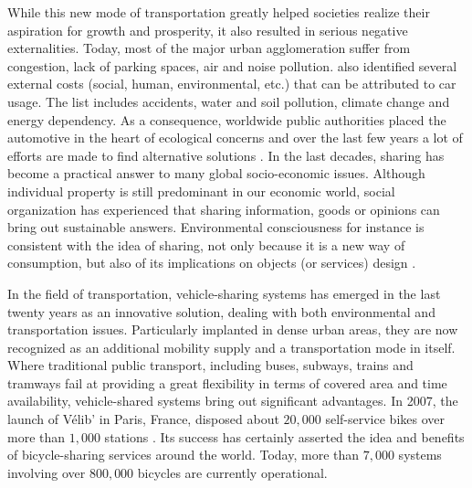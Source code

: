 \begin{bibunit}[ieeetr]
\medskip
While this new mode of transportation greatly helped societies realize their aspiration for growth and prosperity, it also resulted in serious negative externalities.
Today, most of the major urban agglomeration suffer from congestion, lack of parking spaces, air and noise pollution.
\cite{maibach_handbook_2007} also identified several external costs (social, human, environmental, etc.) that can be attributed to car usage.
The list includes accidents, water and soil pollution, climate change and energy dependency.
As a consequence, worldwide public authorities placed the automotive in the heart of ecological concerns and over the last few years a lot of efforts are made to find alternative solutions \cite{mitchell_reinventing_2010}.
In the last decades, sharing has become a practical answer to many global socio-economic issues.
Although individual property is still predominant in our economic world, social organization has experienced that sharing information, goods or opinions can bring out sustainable answers.
Environmental consciousness for instance is consistent with the idea of sharing, not only because it is a new way of consumption, but also of its implications on objects (or services) design \cite{ciari_sharing_2012}.

\medskip
In the field of transportation, vehicle-sharing systems has emerged in the last twenty years as an innovative solution, dealing with both environmental and transportation issues.
Particularly implanted in dense urban areas, they are now recognized as an additional mobility supply and a transportation mode in itself.
Where traditional public transport, including buses, subways, trains and tramways fail at providing a great  flexibility in terms of covered area and time availability, vehicle-shared systems bring out significant advantages.
In 2007, the launch of V{\'e}lib' in Paris, France, disposed about $20,000$ self-service bikes over more than $1,000$ stations \cite{laporte_shared_2015}.
Its success has certainly asserted the idea and benefits of bicycle-sharing services around the world.
Today, more than $7,000$ systems involving over $800,000$ bicycles are currently operational.


\end{bibunit}
